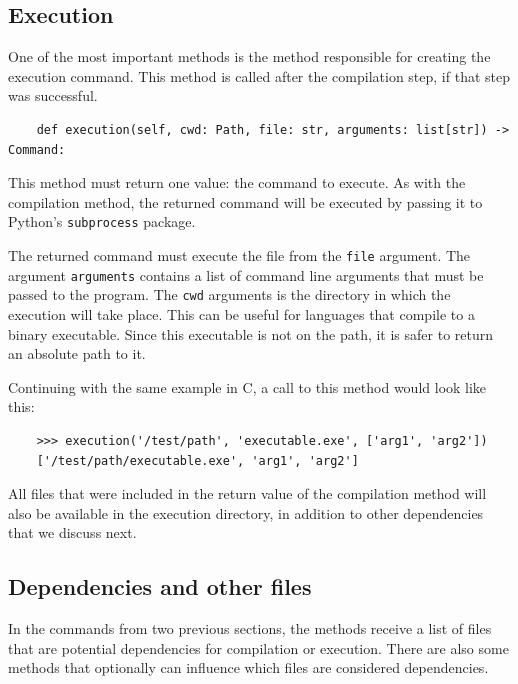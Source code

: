 \documentclass[../main]{subfiles}
\begin{document}
\subsection{Execution}\label{subsec:impl-execution}

One of the most important methods is the method responsible for creating the execution command.
This method is called after the compilation step, if that step was successful.

\begin{verbatim}
    def execution(self, cwd: Path, file: str, arguments: list[str]) -> Command:
\end{verbatim}

This method must return one value: the command to execute.
As with the compilation method, the returned command will be executed by passing it to Python's \texttt{subprocess} package.

The returned command must execute the file from the \texttt{file} argument.
The argument \texttt{arguments} contains a list of command line arguments that must be passed to the program.
The \texttt{cwd} arguments is the directory in which the execution will take place.
This can be useful for languages that compile to a binary executable.
Since this executable is not on the path, it is safer to return an absolute path to it.

Continuing with the same example in C, a call to this method would look like this:

\begin{verbatim}
    >>> execution('/test/path', 'executable.exe', ['arg1', 'arg2'])
    ['/test/path/executable.exe', 'arg1', 'arg2']
\end{verbatim}

All files that were included in the return value of the compilation method will also be available in the execution directory, in addition to other dependencies that we discuss next.

\subsection{Dependencies and other files}\label{subsec:dependencies-and-other-files}

In the commands from two previous sections, the methods receive a list of files that are potential dependencies for compilation or execution.
There are also some methods that optionally can influence which files are considered dependencies.
\end{document}
